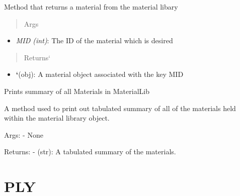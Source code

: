 \documentclass[letterpaper,10pt,english]{sphinxmanual}
\begin{document}
\begin{fulllineitems}
\begin{fulllineitems}
\label{structures:AeroComBAT.Structures.MaterialLib.getMat}
Method that returns a material from the material libary
\begin{quote}\begin{description}
\item[{Args}] \leavevmode
\end{description}\end{quote}
\begin{itemize}
\item {} 
\emph{MID (int)}: The ID of the material which is desired

\end{itemize}
\begin{quote}\begin{description}
\item[{Returns{}`}] \leavevmode
\end{description}\end{quote}
\begin{itemize}
\item {} 
{\color{red}\bfseries{}{}`}(obj): A material object associated with the key MID

\end{itemize}

\end{fulllineitems}


\begin{fulllineitems}
\label{structures:AeroComBAT.Structures.MaterialLib.printSummary}
Prints summary of all Materials in MaterialLib

A method used to print out tabulated summary of all of the materials
held within the material library object.

Args:
- None

Returns:
- (str): A tabulated summary of the materials.

\end{fulllineitems}


\end{fulllineitems}



\section{PLY}
\label{structures:ply}
\end{document}
